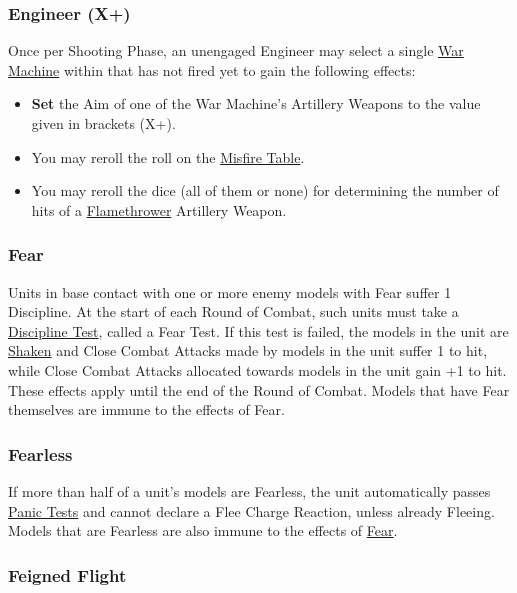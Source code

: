 \subsubsection{Engineer (X+)}
\idx[main=y]{\engineer{}}\label{engineer}

Once per Shooting Phase, an unengaged Engineer may select a single \hyperref[war_machine]{War Machine} within  that has not fired yet to gain the following effects:

\begin{itemize}
\item \textbf{Set} the Aim of one of the War Machine's Artillery Weapons to the value given in brackets (X+).
\item You may reroll the roll on the \hyperref[the_misfire_table]{Misfire Table}.
\item You may reroll the dice (all of them or none) for determining the number of hits of a \hyperref[flamethrower]{Flamethrower} Artillery Weapon.
\end{itemize}

\subsubsection{Fear}
\idx[main=y]{\fear}\label{fear}

Units in base contact with one or more enemy models with Fear suffer \minuss{}1 Discipline. At the start of each Round of Combat, such units must take a \hyperref[discipline_tests]{Discipline Test}, called a Fear Test. If this test is failed, the models in the unit are \hyperref[shaken]{Shaken} and Close Combat Attacks made by models in the unit suffer \minuss{}1 to hit, while Close Combat Attacks allocated towards models in the unit gain +1 to hit. These effects apply until the end of the Round of Combat. Models that have Fear themselves are immune to the effects of Fear.

\subsubsection{Fearless}
\idx[main=y]{\fearless}\label{fearless}

If more than half of a unit's models are Fearless, the unit automatically passes \hyperref[panic_test]{Panic Tests} and cannot declare a Flee Charge Reaction, unless already Fleeing. Models that are Fearless are also immune to the effects of \hyperref[fear]{Fear}.

\subsubsection{Feigned Flight}
\idx[main=y]{\feignedflight}\label{feigned_flight}

